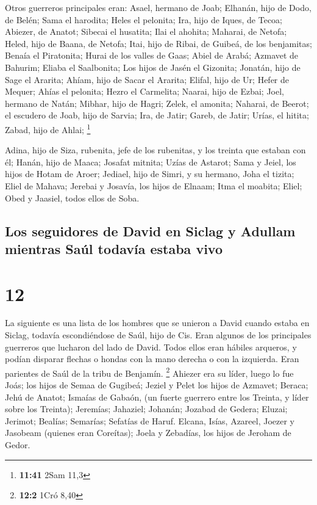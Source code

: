  Otros guerreros principales eran: Asael, hermano de
Joab; Elhanán, hijo de Dodo, de Belén;  Sama el harodita;
Heles el pelonita;  Ira, hijo de Iques, de Tecoa;
Abiezer, de Anatot;  Sibecai el husatita; Ilai el
ahohita;  Maharai, de Netofa; Heled, hijo de Baana, de
Netofa;  Itai, hijo de Ribai, de Guibeá, de los
benjamitas; Benaía el Piratonita;  Hurai de los valles de
Gaas; Abiel de Arabá;  Azmavet de Bahurim; Eliaba el
Saalbonita;  Los hijos de Jasén el Gizonita; Jonatán,
hijo de Sage el Ararita;  Ahíam, hijo de Sacar el
Ararita; Elifal, hijo de Ur;  Hefer de Mequer; Ahías el
pelonita;  Hezro el Carmelita; Naarai, hijo de Ezbai;
 Joel, hermano de Natán; Mibhar, hijo de Hagri;
 Zelek, el amonita; Naharai, de Beerot; el escudero de
Joab, hijo de Sarvia;  Ira, de Jatir; Gareb, de Jatir;
 Urías, el hitita; Zabad, hijo de Ahlai; \footnote{\textbf{11:41}
  2Sam 11,3}

 Adina, hijo de Siza, rubenita, jefe de los rubenitas, y
los treinta que estaban con él;  Hanán, hijo de Maaca;
Josafat mitnita;  Uzías de Astarot; Sama y Jeiel, los
hijos de Hotam de Aroer;  Jediael, hijo de Simri, y su
hermano, Joha el tizita;  Eliel de Mahava; Jerebai y
Josavía, los hijos de Elnaam; Itma el moabita;  Eliel;
Obed y Jaasiel, todos ellos de Soba.

\hypertarget{los-seguidores-de-david-en-siclag-y-adullam-mientras-sauxfal-todavuxeda-estaba-vivo}{%
\subsection{Los seguidores de David en Siclag y Adullam mientras Saúl
todavía estaba
vivo}\label{los-seguidores-de-david-en-siclag-y-adullam-mientras-sauxfal-todavuxeda-estaba-vivo}}

\hypertarget{section-11}{%
\section{12}\label{section-11}}

 La siguiente es una lista de los hombres que se unieron a
David cuando estaba en Siclag, todavía escondiéndose de Saúl, hijo de
Cis. Eran algunos de los principales guerreros que lucharon del lado de
David.  Todos ellos eran hábiles arqueros, y podían
disparar flechas o hondas con la mano derecha o con la izquierda. Eran
parientes de Saúl de la tribu de Benjamín. \footnote{\textbf{12:2} 1Cró
  8,40}  Ahiezer era su líder, luego lo fue Joás; los
hijos de Semaa de Gugibeá; Jeziel y Pelet los hijos de Azmavet; Beraca;
Jehú de Anatot;  Ismaías de Gabaón, (un fuerte guerrero
entre los Treinta, y líder sobre los Treinta); Jeremías; Jahaziel;
Johanán; Jozabad de Gedera;  Eluzai; Jerimot; Bealías;
Semarías; Sefatías de Haruf.  Elcana, Isías, Azareel,
Joezer y Jasobeam (quienes eran Coreítas);  Joela y
Zebadías, los hijos de Jeroham de Gedor.

